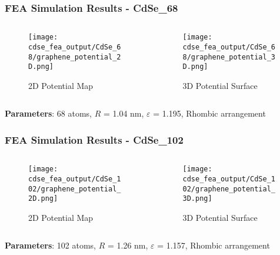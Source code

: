 \documentclass{beamer}
\begin{document}
\begin{frame}
\frametitle{FEA Simulation Results - CdSe\_68}
\begin{columns}
\begin{column}{0.5\textwidth}
\begin{figure}
\centering
\texttt{[image: cdse\_fea\_output/CdSe\_68/graphene\_potential\_2D.png]}
\caption{2D Potential Map}
\end{figure}
\end{column}
\begin{column}{0.5\textwidth}
\begin{figure}
\centering
\texttt{[image: cdse\_fea\_output/CdSe\_68/graphene\_potential\_3D.png]}
\caption{3D Potential Surface}
\end{figure}
\end{column}
\end{columns}

\textbf{Parameters}: 68 atoms, $R$ = 1.04 nm, $\varepsilon$ = 1.195, Rhombic arrangement
\end{frame}

\begin{frame}
\frametitle{FEA Simulation Results - CdSe\_102}
\begin{columns}
\begin{column}{0.5\textwidth}
\begin{figure}
\centering
\texttt{[image: cdse\_fea\_output/CdSe\_102/graphene\_potential\_2D.png]}
\caption{2D Potential Map}
\end{figure}
\end{column}
\begin{column}{0.5\textwidth}
\begin{figure}
\centering
\texttt{[image: cdse\_fea\_output/CdSe\_102/graphene\_potential\_3D.png]}
\caption{3D Potential Surface}
\end{figure}
\end{column}
\end{columns}

\textbf{Parameters}: 102 atoms, $R$ = 1.26 nm, $\varepsilon$ = 1.157, Rhombic arrangement
\end{frame}
\end{document}
